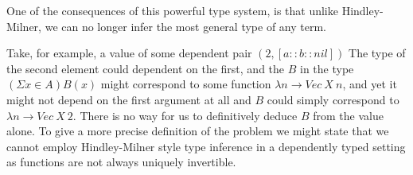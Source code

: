           One of the consequences of this powerful type system,
          is that unlike Hindley-Milner, we can no longer infer the
          most general type of any term.

          Take, for example, a value of some dependent pair $(2 , [a :: b
            :: nil])$ The type of the second element could
          dependent on the first, and the $B$ in the type $(
          \Sigma x \in A ) B(x)$ might correspond to some function $\lambda
          n \to Vec \: X \: n$, and yet it might not depend on the first
          argument at all and $B$ could simply correspond to $\lambda n \to
          Vec \: X \: 2$. There is no way for us to definitively
          deduce $B$ from the value alone. To give a more precise
          definition of the problem we might state that we cannot
          employ Hindley-Milner style type inference in a dependently
          typed setting as functions are not always uniquely invertible.

